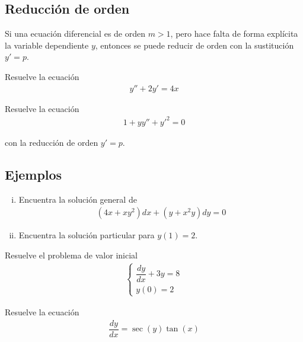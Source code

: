 \subsection{Reducción de orden}
{}
  Si una ecuación diferencial es de orden $m>1$, pero hace falta de forma explícita la variable dependiente $y$, entonces se puede reducir de orden con la sustitución 
  $y'=p$.

{}
  \begin{problema}
   Resuelve la ecuación
   \begin{align*}
    y''+2y'=4x
    \end{align*}
  \end{problema}


{}
  \begin{problema}
   Resuelve la ecuación 
   \begin{align*}
    1+yy''+y'^{2} = 0
    \end{align*}
  \end{problema}
con la reducción de orden $y'=p$.

\subsection{Ejemplos}
{}
  \begin{problema}
   \begin{enumerate}[(i)]
     \item Encuentra la solución general de 
     \begin{align*}
      \left( 4x+xy^{2} \right)dx+\left( y+x^{2}y \right)dy = 0
      \end{align*}
     
     \item Encuentra la solución particular para $y(1)=2$.
\end{enumerate}
  \end{problema}


{}
  Resuelve el problema de valor inicial
  \begin{align*}
   \begin{cases}
\dfrac{dy}{dx}+3y=8 \\
y(0)=2
\end{cases}
   \end{align*}

{}
  \begin{problema}
   Resuelve la ecuación
   \begin{align*}
    \dfrac{dy}{dx} = \sec(y)\tan(x)
    \end{align*}
  \end{problema}


